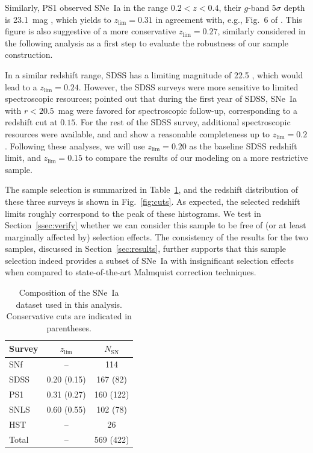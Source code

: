 \documentclass[]{aa}
\newcommand{\nn}[1]{\textcolor[rgb]{0.4, 0.8, 0}{#1}}
\begin{document}
Similarly, PS1 observed SNe~Ia in the range $0.2<z<0.4$, their $g$-band
$5\sigma$ depth is 23.1~mag \citep{rest2014}, which yields to $z_{\lim}=0.31$ in
agreement with, e.g., Fig.~6 of \cite{scolnic2018a}. This figure is also
suggestive of a more conservative $z_{\lim}=0.27$, \nn{similarly considered in
the following analysis as a first step to evaluate the robustness of our
sample construction.}

In a similar redshift range, SDSS has a limiting magnitude of 22.5
\citep{dilday2008, sako2008}, which would lead to a $z_{\lim}=0.24$. However,
the SDSS surveys were more sensitive to limited spectroscopic resources;
\citet[][see their Section~2]{kessler2009} pointed out that during the first year
of SDSS, SNe~Ia with $r<20.5$~mag were favored for spectroscopic follow-up,
corresponding to a redshift cut at $0.15$. For the rest of the SDSS survey,
additional spectroscopic resources were available, and \cite{kessler2009} and
\cite{dilday2008} show a reasonable completeness up to $z_{\lim}=0.2$. Following
these analyses, we will use $z_{\lim}=0.20$ as the baseline SDSS redshift limit,
\nn{and $z_{\lim}=0.15$ to compare the results of our modeling on a more
restrictive sample.}

The sample selection is summarized in Table~\ref{tab:sample}, and the redshift
distribution of these three surveys is shown in Fig.~\ref{fig:cuts}. As
expected, the selected redshift limits roughly correspond to the peak of these
histograms. \nn{We test in Section~\ref{ssec:verify} whether we can consider
this sample to be free of (or at least marginally affected by) selection
effects. The consistency of the results for the two samples, discussed} in
Section~\ref{sec:results}, further supports that this sample selection indeed
provides a subset of SNe~Ia with insignificant selection effects when compared
to state-of-the-art Malmquist correction techniques.

\begin{table}
    \centering
    \caption{Composition of the SNe~Ia dataset used in this analysis.
    Conservative cuts are indicated in parentheses.}
    \label{tab:sample}
    \begin{tabular}{l c c}
        \hline\hline
        Survey & $z_{\lim}$ & $N_{\mathrm{SN}}$ \\
        \hline
        SNf & -- & 114 \\
        SDSS & 0.20 (0.15) & 167 (82)\\
        PS1 & 0.31 (0.27) & 160 (122)\\
        SNLS & 0.60 (0.55) & 102 (78)\\
        HST & -- & 26 \\
        \hline
        Total & -- & 569 (422) \\
        \hline
    \end{tabular}
\end{table}
\end{document}
